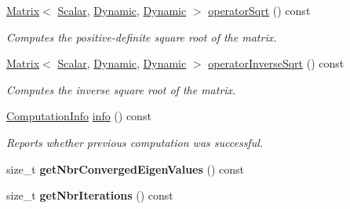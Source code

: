 \begin{DoxyCompactItemize}
\hyperlink{group___core___module_class_eigen_1_1_matrix}{Matrix}$<$ \hyperlink{class_eigen_1_1_arpack_generalized_self_adjoint_eigen_solver_ab1182405bfe87a505d4b7a8311c661ec}{Scalar}, \hyperlink{namespace_eigen_ad81fa7195215a0ce30017dfac309f0b2}{Dynamic}, \hyperlink{namespace_eigen_ad81fa7195215a0ce30017dfac309f0b2}{Dynamic} $>$ \hyperlink{class_eigen_1_1_arpack_generalized_self_adjoint_eigen_solver_a7522aad061ebccc065b254c0bc67d3b0}{operator\+Sqrt} () const
\begin{DoxyCompactList}\small\item\em Computes the positive-\/definite square root of the matrix. \end{DoxyCompactList}\item 
\hyperlink{group___core___module_class_eigen_1_1_matrix}{Matrix}$<$ \hyperlink{class_eigen_1_1_arpack_generalized_self_adjoint_eigen_solver_ab1182405bfe87a505d4b7a8311c661ec}{Scalar}, \hyperlink{namespace_eigen_ad81fa7195215a0ce30017dfac309f0b2}{Dynamic}, \hyperlink{namespace_eigen_ad81fa7195215a0ce30017dfac309f0b2}{Dynamic} $>$ \hyperlink{class_eigen_1_1_arpack_generalized_self_adjoint_eigen_solver_ad55f052b675f1deaea220d0cc225622a}{operator\+Inverse\+Sqrt} () const
\begin{DoxyCompactList}\small\item\em Computes the inverse square root of the matrix. \end{DoxyCompactList}\item 
\hyperlink{group__enums_ga85fad7b87587764e5cf6b513a9e0ee5e}{Computation\+Info} \hyperlink{class_eigen_1_1_arpack_generalized_self_adjoint_eigen_solver_a6f952eed50efe01b8cb91726e6a93b68}{info} () const
\begin{DoxyCompactList}\small\item\em Reports whether previous computation was successful. \end{DoxyCompactList}\item 
\mbox{\label{class_eigen_1_1_arpack_generalized_self_adjoint_eigen_solver_a932fe19093ee98c14c1c6d28a8c829b0}} 
size\+\_\+t {\bfseries get\+Nbr\+Converged\+Eigen\+Values} () const
\item 
\mbox{\label{class_eigen_1_1_arpack_generalized_self_adjoint_eigen_solver_afa3f79bab571b043f970ec4ca685a99c}} 
size\+\_\+t {\bfseries get\+Nbr\+Iterations} () const
\end{DoxyCompactItemize}
